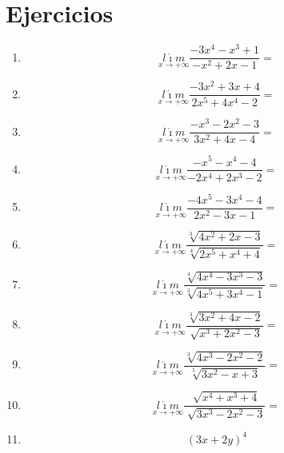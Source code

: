\documentclass[oneside,spanish,letter]{article}
\begin{document}
\section{Ejercicios}
\begin{enumerate}
 \item $$\underset{x\rightarrow +\infty}{l\acute{\imath}m} \frac{-3x^4-x^3+1}{-x^2+2x-1}=$$
 \item $$\underset{x\rightarrow +\infty}{l\acute{\imath}m} \frac{-3x^2+3x+4}{2x^5+4x^4-2}=$$
 \item $$\underset{x\rightarrow +\infty}{l\acute{\imath}m} \frac{-x^3-2x^2-3}{3x^2+4x-4}=$$
 \item $$\underset{x\rightarrow +\infty}{l\acute{\imath}m} \frac{-x^5-x^4-4}{-2x^4+2x^3-2}=$$
 \item $$\underset{x\rightarrow +\infty}{l\acute{\imath}m} \frac{-4x^5-3x^4-4}{2x^2-3x-1}=$$
 \item $$\underset{x\rightarrow +\infty}{l\acute{\imath}m} \frac{\sqrt[3]{4x^2+2x-3}}{\sqrt[4]{2x^5+x^4+4}}=$$
 \item $$\underset{x\rightarrow +\infty}{l\acute{\imath}m} \frac{\sqrt[4]{4x^4-3x^3-3}}{\sqrt[3]{4x^5+3x^4-1}}=$$
 \item $$\underset{x\rightarrow +\infty}{l\acute{\imath}m} \frac{\sqrt[3]{3x^2+4x-2}}{\sqrt[]{x^3+2x^2-3}}=$$
 \item $$\underset{x\rightarrow +\infty}{l\acute{\imath}m} \frac{\sqrt[3]{4x^3-2x^2-2}}{\sqrt[5]{3x^2-x+3}}=$$
 \item $$\underset{x\rightarrow +\infty}{l\acute{\imath}m} \frac{\sqrt[]{x^4+x^3+4}}{\sqrt[]{3x^3-2x^2-3}}=$$
\item $$(3x+2y)^4$$
 \end{enumerate}
  \newpage
\end{document}
